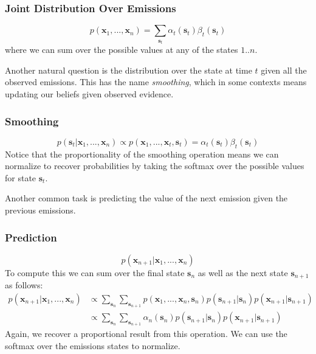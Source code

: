 \subsubsection{Joint Distribution Over Emissions}
\begin{equation} \label{joint-fn}
	p(\textbf{x}_1, ..., \textbf{x}_n) = \sum_{\textbf{s}_t} \alpha_t(\textbf{s}_t) \beta_t(\textbf{s}_t)
\end{equation}
where we can sum over the possible values at any of the states $1..n$.

Another natural question is the distribution over the state at time $t$ given all the observed emissions. This has the name \textit{smoothing}, which in some contexts means updating our beliefs given observed evidence.

\subsubsection{Smoothing}
\begin{equation} \label{smoothing-fn}
	p(\textbf{s}_t | \textbf{x}_1, ..., \textbf{x}_n) \propto p(\textbf{x}_1, ..., \textbf{x}_t, \textbf{s}_t) = \alpha_t(\textbf{s}_t) \beta_t(\textbf{s}_t)
\end{equation}
Notice that the proportionality of the smoothing operation means we can normalize to recover probabilities by taking the softmax over the possible values for state $\textbf{s}_t$.

Another common task is predicting the value of the next emission given the previous emissions.

\subsubsection{Prediction}
\begin{equation} \label{prediction-fn}
	p(\textbf{x}_{n+1} | \textbf{x}_1, ..., \textbf{x}_n)
\end{equation}
To compute this we can sum over the final state $\textbf{s}_n$ as well as the next state $\textbf{s}_{n+1}$ as follows:
\begin{align}
	p(\textbf{x}_{n+1} | \textbf{x}_1, ..., \textbf{x}_n) &\propto \sum_{\textbf{s}_n} \sum_{\textbf{s}_{n+1}} p(\textbf{x}_1, ..., \textbf{x}_n, \textbf{s}_n) p(\textbf{s}_{n+1} | \textbf{s}_n) p(\textbf{x}_{n+1} | \textbf{s}_{n+1}) \\
	&\propto \sum_{\textbf{s}_n} \sum_{\textbf{s}_{n+1}} \alpha_{n}(\textbf{s}_n) p(\textbf{s}_{n+1} | \textbf{s}_n) p(\textbf{x}_{n+1} | \textbf{s}_{n+1})
\end{align}
Again, we recover a proportional result from this operation. We can use the softmax over the emissions states to normalize.

